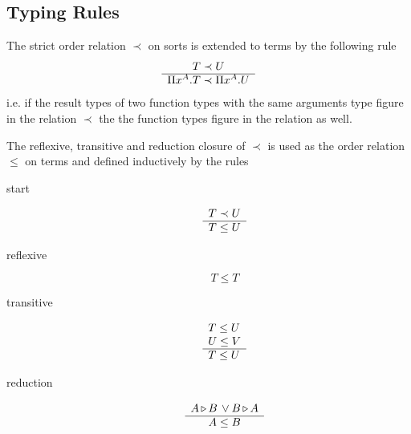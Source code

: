\subsection{Typing Rules}
\label{sec:typing-rules}

\begin{definition}
  The strict order relation $\prec$ on sorts is extended to terms by the following
  rule
  $$
  \begin{array}{c} T \prec U \\ \hline \Pi x^A.T \prec \Pi x^A. U\end{array}
  $$
  i.e. if the result types of two function types with the same arguments type
  figure in the relation $\prec$ the the function types figure in the relation
  as well.
\end{definition}

\begin{definition}
  The reflexive, transitive and reduction closure of $\prec$ is used as the
  order relation $\le$ on terms and defined inductively by the rules
  \begin{description}
  \item[start]
    $$
    \begin{array}{l} T \prec U \\ \hline T \le U\end{array}
    $$

  \item[reflexive]
    $$
    T \le T
    $$

  \item[transitive]
    $$
    \begin{array}{l} T \le U \\ U \le V \\ \hline T \le U\end{array}
    $$

  \item[reduction]
    $$
    \begin{array}{c} A {\,\triangleright\,} B \, \lor B {\,\triangleright\,} A \\ \hline A \le B\end{array}
    $$
  \end{description}
\end{definition}


